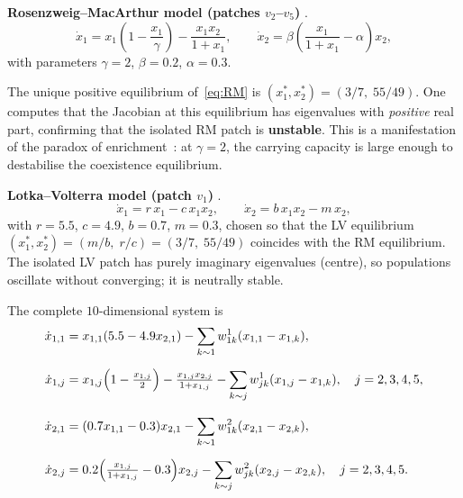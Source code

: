 \documentclass[12pt,a4paper]{article}
\theoremstyle{definition}
\begin{document}
\medskip
\noindent\textbf{Rosenzweig--MacArthur model (patches $v_2$--$v_5$)}
\cite{kot2001}.
\begin{equation}
  \dot{x}_1 = x_1\!\left(1 - \frac{x_1}{\gamma}\right)
              - \frac{x_1 x_2}{1+x_1},
  \qquad
  \dot{x}_2 = \beta\!\left(\frac{x_1}{1+x_1} - \alpha\right)\!x_2,
  \label{eq:RM}
\end{equation}
with parameters $\gamma = 2$, $\beta = 0.2$, $\alpha = 0.3$.

The unique positive equilibrium of~\eqref{eq:RM} is
$(x_1^*, x_2^*) = (3/7,\; 55/49)$.
One computes that the Jacobian at this equilibrium has eigenvalues
with \emph{positive} real part, confirming that the isolated RM
patch is \textbf{unstable}.
This is a manifestation of the paradox of
enrichment~\cite{rosenzweig1971}: at $\gamma = 2$, the carrying
capacity is large enough to destabilise the coexistence equilibrium.

\medskip
\noindent\textbf{Lotka--Volterra model (patch $v_1$) }\cite{kot2001}.
\begin{equation*}
  \dot{x}_1 = r\,x_1 - c\,x_1 x_2,
  \qquad
  \dot{x}_2 = b\,x_1 x_2 - m\,x_2,
  \label{eq:LV}
\end{equation*}
with $r = 5.5$, $c = 4.9$, $b = 0.7$, $m = 0.3$, chosen so that the
LV equilibrium $(x_1^*, x_2^*) = (m/b,\; r/c) = (3/7,\; 55/49)$
coincides with the RM equilibrium.
The isolated LV patch has purely imaginary eigenvalues (centre), so
populations oscillate without converging; it is neutrally stable.



The complete $10$-dimensional system is
\begin{align*}
\dot{x}_{1,1} &= x_{1,1}(5.5 - 4.9 x_{2,1}) 
  - \sum_{k\sim 1} w^1_{1k}(x_{1,1} - x_{1,k}), \\[6pt]
\dot{x}_{1,j} &= x_{1,j}\Bigl(1 - \tfrac{x_{1,j}}{2}\Bigr) - \tfrac{x_{1,j}x_{2,j}}{1+x_{1,j}} 
  - \sum_{k\sim j} w^1_{jk}(x_{1,j} - x_{1,k}), \quad j=2,3,4,5, \\[8pt]
\dot{x}_{2,1} &= (0.7 x_{1,1} - 0.3) x_{2,1} 
  - \sum_{k\sim 1} w^2_{1k}(x_{2,1} - x_{2,k}), \\[6pt]
\dot{x}_{2,j} &= 0.2\Bigl(\tfrac{x_{1,j}}{1+x_{1,j}} - 0.3\Bigr) x_{2,j} 
  - \sum_{k\sim j} w^2_{jk}(x_{2,j} - x_{2,k}), \quad j=2,3,4,5.
\end{align*}
\end{document}

